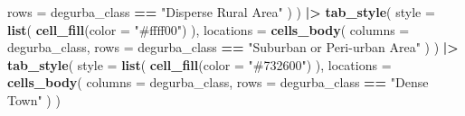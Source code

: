 \documentclass[
]{article}
\newenvironment{Shaded}{\begin{snugshade}}{\end{snugshade}}
\newcommand{\AttributeTok}[1]{\textcolor[rgb]{0.13,0.29,0.53}{#1}}
\newcommand{\FunctionTok}[1]{\textcolor[rgb]{0.13,0.29,0.53}{\textbf{#1}}}
\newcommand{\NormalTok}[1]{#1}
\newcommand{\SpecialCharTok}[1]{\textcolor[rgb]{0.81,0.36,0.00}{\textbf{#1}}}
\newcommand{\StringTok}[1]{\textcolor[rgb]{0.31,0.60,0.02}{#1}}
\newenvironment{UNFPAShadedBox}{%
\begin{tcolorbox}[sharp corners, enhanced, colback=white, boxrule=0pt, borderline west={2pt}{0pt}{orange}]%
}{\end{tcolorbox}}
\newenvironment{Highlighting}{\begin{UNFPAShadedBox}}{\end{UNFPAShadedBox}}
\begin{document}
\begin{Shaded}
\begin{Highlighting}[]
      \AttributeTok{rows =}\NormalTok{ degurba\_class }\SpecialCharTok{==} \StringTok{"Disperse Rural Area"}
\NormalTok{    )}
\NormalTok{  ) }\SpecialCharTok{|\textgreater{}}
  \FunctionTok{tab\_style}\NormalTok{(}
    \AttributeTok{style =} \FunctionTok{list}\NormalTok{(}
      \FunctionTok{cell\_fill}\NormalTok{(}\AttributeTok{color =} \StringTok{"\#ffff00"}\NormalTok{)}
\NormalTok{      ),}
    \AttributeTok{locations =} \FunctionTok{cells\_body}\NormalTok{(}
      \AttributeTok{columns =}\NormalTok{ degurba\_class,}
      \AttributeTok{rows =}\NormalTok{ degurba\_class }\SpecialCharTok{==} \StringTok{"Suburban or Peri{-}urban Area"}
\NormalTok{    )}
\NormalTok{  ) }\SpecialCharTok{|\textgreater{}}
  \FunctionTok{tab\_style}\NormalTok{(}
    \AttributeTok{style =} \FunctionTok{list}\NormalTok{(}
      \FunctionTok{cell\_fill}\NormalTok{(}\AttributeTok{color =} \StringTok{"\#732600"}\NormalTok{)}
\NormalTok{      ),}
    \AttributeTok{locations =} \FunctionTok{cells\_body}\NormalTok{(}
      \AttributeTok{columns =}\NormalTok{ degurba\_class,}
      \AttributeTok{rows =}\NormalTok{ degurba\_class }\SpecialCharTok{==} \StringTok{"Dense Town"}
\NormalTok{    )}
\NormalTok{  )}
\end{Highlighting}
\end{Shaded}
\end{document}
